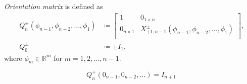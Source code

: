 \documentclass[../methodology.tex]{subfiles}
\begin{document}
\begin{definition}\label{M:Orientation}
    \textit{Orientation matrix} is defined as
    \begin{align*}
        Q^{\pm}_n\left(\phi_{n-1},\phi_{n-2},\dots,\phi_1\right)
         & \coloneqq
        \begin{bmatrix}
            1             & 0_{1\times n}                                                   \\
            0_{n\times 1} & X^{\pm}_{+1,n-1}\left(\phi_{n-1},\phi_{n-2},\dots,\phi_1\right) \\
        \end{bmatrix}\text{,} \\
        Q^{\pm}_0
         & \coloneqq\pm I_1\text{,}
    \end{align*}
    where \(\phi_m\in\mathbb{R}^m\) for \(m = 1, 2, \dots, n-1\).
\end{definition}
\begin{corollary}\label{M:Orientation:Identity}
    \[
        Q^{+}_{n}
        \left(0_{n-1}, 0_{n-2},\dots\right)
        =
        I_{n+1}
    \]
\end{corollary}
\end{document}
